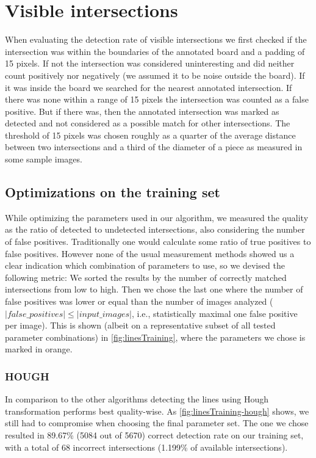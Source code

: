 	\section{Visible intersections}
	\label{evaluation-visible}
	When evaluating the detection rate of visible intersections we first checked if the intersection was within the boundaries of the annotated board and a padding of 15 pixels. If not the intersection was considered uninteresting and did neither count positively nor negatively (we assumed it to be noise outside the board). If it was inside the board we searched for the nearest annotated intersection. If there was none within a range of 15 pixels the intersection was counted as a false positive. But if there was, then the annotated intersection was marked as detected and not considered as a possible match for other intersections. The threshold of 15 pixels was chosen roughly as a quarter of the average distance between two intersections and a third of the diameter of a piece as measured in some sample images.

	

	\subsection{Optimizations on the training set}
	\label{evaluation-visible-optimization}
	While optimizing the parameters used in our algorithm, we measured the quality as the ratio of detected to undetected intersections, also considering the number of false positives. Traditionally one would calculate some ratio of true positives to false positives. However none of the usual measurement methods showed us a clear indication which combination of parameters to use, so we devised the following metric: We sorted the results by the number of correctly matched intersections from low to high. Then we chose the last one where the number of false positives was lower or equal than the number of images analyzed ($|false\_positives| \leq |input\_images|$, i.e., statistically maximal one false positive per image). This is shown (albeit on a representative subset of all tested parameter combinations) in \autoref{fig:linesTraining}, where the parameters we chose is marked in orange.

	\subsubsection{HOUGH}
	\label{evaluation-visible-optimization-hough}
	In comparison to the other algorithms detecting the lines using Hough transformation performs best quality-wise. As \autoref{fig:linesTraining-hough} shows, we still had to compromise when choosing the final parameter set. The one we chose resulted in 89.67\% (5084 out of 5670) correct detection rate on our training set, with a total of 68 incorrect intersections (1.199\% of available intersections).

